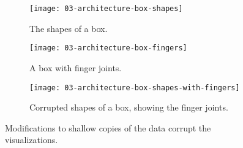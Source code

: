 \documentclass[../../ClassicThesis.tex]{subfiles}
\begin{document}
\begin{figure}[h]
  \centering
  \begin{subfigure}[b]{0.3222\textwidth}
    \texttt{[image: 03-architecture-box-shapes]}
    \caption{The shapes of a box.}
    \label{fig:corrupt:shapes}
  \end{subfigure}
  \begin{subfigure}[b]{0.3222\textwidth}
    \texttt{[image: 03-architecture-box-fingers]}
    \caption{A box with finger joints.}
    \label{fig:corrupt:fingers}
  \end{subfigure}
  \begin{subfigure}[b]{0.3222\textwidth}
    \texttt{[image: 03-architecture-box-shapes-with-fingers]}
    \caption{Corrupted shapes of a box, showing the finger joints.}
    \label{fig:corrupt:shapes-fingers}
  \end{subfigure}
  \caption{Modifications to shallow copies of the data
    corrupt the visualizations.}
  \label{fig:corrupt}
\end{figure}




\end{document}
